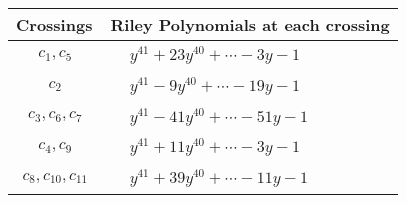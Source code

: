 \documentclass[1p]{elsarticle_modified}
\theoremstyle{definition}
\begin{document}
\begin{tabular}{m{50pt}|m{274pt}}
Crossings & \hspace{64pt}Riley Polynomials at each crossing \\
\hline $$\begin{aligned}c_{1},c_{5}\end{aligned}$$&$\begin{aligned}
&y^{41}+23 y^{40}+\cdots-3 y-1
\end{aligned}$\\
\hline $$\begin{aligned}c_{2}\end{aligned}$$&$\begin{aligned}
&y^{41}-9 y^{40}+\cdots-19 y-1
\end{aligned}$\\
\hline $$\begin{aligned}c_{3},c_{6},c_{7}\end{aligned}$$&$\begin{aligned}
&y^{41}-41 y^{40}+\cdots-51 y-1
\end{aligned}$\\
\hline $$\begin{aligned}c_{4},c_{9}\end{aligned}$$&$\begin{aligned}
&y^{41}+11 y^{40}+\cdots-3 y-1
\end{aligned}$\\
\hline $$\begin{aligned}c_{8},c_{10},c_{11}\end{aligned}$$&$\begin{aligned}
&y^{41}+39 y^{40}+\cdots-11 y-1
\end{aligned}$\\
\hline
\end{tabular}
\vskip 2pc
\end{document}
